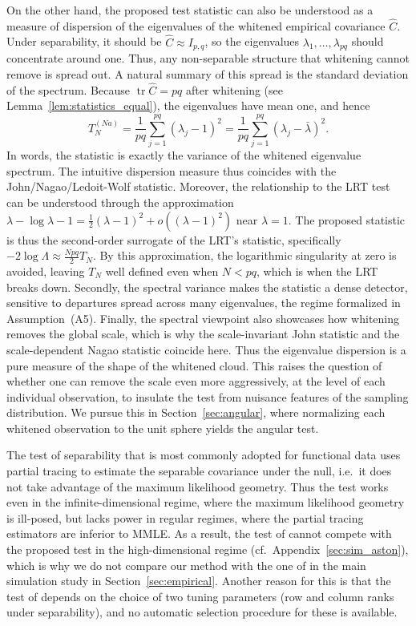 \documentclass[12pt]{article}
\newcommand{\tr}{\operatorname{tr}}
\begin{document}
On the other hand, the proposed test statistic can also be understood as a measure of dispersion of the eigenvalues of the whitened empirical covariance $\widehat C$. Under separability, it should be $\widehat{C} \approx I_{p,q}$, so the eigenvalues $\lambda_1,\ldots,\lambda_{pq}$ should concentrate around one. Thus, any non-separable structure that whitening cannot remove is spread out. A natural summary of this spread is the standard deviation of the spectrum. Because $\tr{\widehat{C}}=pq$ after whitening (see Lemma~\ref{lem:statistics_equal}), the eigenvalues have mean one, and hence
\[
T_N^{(Na)}=\frac{1}{pq}\sum_{j=1}^{pq}(\lambda_j-1)^2=\frac{1}{pq}\sum_{j=1}^{pq}(\lambda_j-\bar\lambda)^2.
\]
In words, the statistic is exactly the variance of the whitened eigenvalue spectrum. The intuitive dispersion measure thus coincides with the John/Nagao/Ledoit-Wolf statistic. Moreover, the relationship to the LRT test can be understood through the approximation $\lambda-\log\lambda-1=\tfrac12(\lambda-1)^2+o((\lambda-1)^2)$ near $\lambda=1$. The proposed statistic is thus the second-order surrogate of the LRT's statistic, specifically $-2\log\Lambda\approx \tfrac{Npq}{2}T_N$. By this approximation, the logarithmic singularity at zero is avoided, leaving $T_N$ well defined even when $N < pq$, which is when the LRT breaks down. Secondly, the spectral variance makes the statistic a dense detector, sensitive to departures spread across many eigenvalues, the regime formalized in Assumption~(A5). Finally, the spectral viewpoint also showcases how whitening removes the global scale, which is why the scale-invariant John statistic and the scale-dependent Nagao statistic coincide here. Thus the eigenvalue dispersion is a pure measure of the shape of the whitened cloud. This raises the question of whether one can remove the scale even more aggressively, at the level of each individual observation, to insulate the test from nuisance features of the sampling distribution. We pursue this in Section~\ref{sec:angular}, where normalizing each whitened observation to the unit sphere yields the angular test.

The test of separability that is most commonly adopted for functional data \citep{aston2017tests} uses partial tracing to estimate the separable covariance under the null, i.e.~it does not take advantage of the maximum likelihood geometry. Thus the test works even in the infinite-dimensional regime, where the maximum likelihood geometry is ill-posed, but lacks power in regular regimes, where the partial tracing estimators are inferior to MMLE. As a result, the test of \citet{aston2017tests} cannot compete with the proposed test in the high-dimensional regime (cf.~Appendix~\ref{sec:sim_aston}), which is why we do not compare our method with the one of \citet{aston2017tests} in the main simulation study in Section~\ref{sec:empirical}. Another reason for this is that the test of \citet{aston2017tests} depends on the choice of two tuning parameters (row and column ranks under separability), and no automatic selection procedure for these is available.
\end{document}
